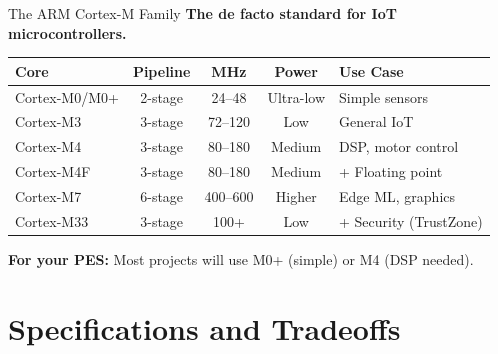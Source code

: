 \documentclass[aspectratio=169,11pt]{beamer}
\begin{document}
\begin{frame}{The ARM Cortex-M Family}
    \textbf{The de facto standard for IoT microcontrollers.}
    
    \vspace{0.3cm}
    \begin{table}
        \centering
        \small
        \begin{tabular}{@{}lcccl@{}}
            \toprule
            \textbf{Core} & \textbf{Pipeline} & \textbf{MHz} & \textbf{Power} & \textbf{Use Case} \\
            \midrule
            Cortex-M0/M0+ & 2-stage & 24--48 & Ultra-low & Simple sensors \\
            Cortex-M3 & 3-stage & 72--120 & Low & General IoT \\
            Cortex-M4 & 3-stage & 80--180 & Medium & DSP, motor control \\
            Cortex-M4F & 3-stage & 80--180 & Medium & + Floating point \\
            Cortex-M7 & 6-stage & 400--600 & Higher & Edge ML, graphics \\
            Cortex-M33 & 3-stage & 100+ & Low & + Security (TrustZone) \\
            \bottomrule
        \end{tabular}
    \end{table}
    
    \vspace{0.3cm}
    \textbf{For your PES:} Most projects will use M0+ (simple) or M4 (DSP needed).
\end{frame}

\section{Specifications and Tradeoffs}
\end{document}
